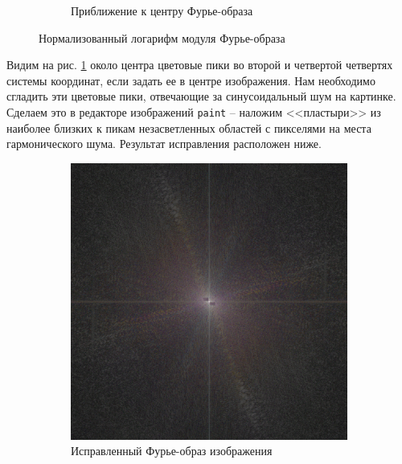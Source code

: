 \documentclass[a4paper, 12pt]{article}
\begin{document}
\begin{figure}[H]
\begin{subfigure}{0.45\textwidth}
            \caption{Приближение к центру Фурье-образа}
            \label{fig:4fft2cl}
        \end{subfigure}
        \caption{Нормализованный логарифм модуля Фурье-образа}
        \label{fig:fft2s}
    \end{figure}


    Видим на рис. \ref{fig:4fft2cl} около центра цветовые пики во второй и четвертой четвертях системы координат,
    если задать ее в центре изображения. Нам необходимо сгладить эти цветовые пики, отвечающие за синусоидальный шум
    на картинке. Сделаем это в редакторе изображений \texttt{paint} -- наложим <<пластыри>> из наиболее близких к пикам
    незасветленных областей с пикселями на места гармонического шума. Результат исправления расположен ниже.
    \begin{figure}[H]
        \centering
        \begin{subfigure}{0.45\textwidth}
            \centering
            \includegraphics[width=\linewidth]{corr_fft2.png}
            \caption{Исправленный Фурье-образ изображения}
            \label{fig:corfft2}
        \end{subfigure}
        \begin{subfigure}{0.45\textwidth}
            \centering

\end{subfigure}
\end{figure}
\end{document}
